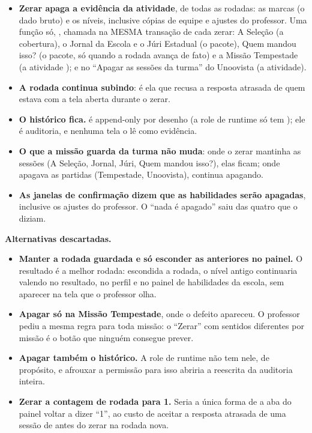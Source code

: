\begin{itemize}
  \item \textbf{Zerar apaga a evidência da atividade}, de todas as rodadas: as
    marcas (o dado bruto) e os níveis, inclusive cópias de equipe e ajustes do
    professor. Uma função só, , chamada
    na MESMA transação de cada zerar: A Seleção (a cobertura), o Jornal da
    Escola e o Júri Estadual (o pacote), Quem mandou isso? (o pacote, só
    quando a rodada avança de fato) e a Missão Tempestade (a atividade
    ); e no \enquote{Apagar as sessões da turma} do Unoovista (a
    atividade).
  \item \textbf{A rodada continua subindo}: é ela que recusa a resposta
    atrasada de quem estava com a tela aberta durante o zerar.
  \item \textbf{O histórico fica.}  é append-only por
    desenho (a role de runtime só tem ); ele é auditoria, e
    nenhuma tela o lê como evidência.
  \item \textbf{O que a missão guarda da turma não muda}: onde o zerar mantinha
    as sessões (A Seleção, Jornal, Júri, Quem mandou isso?), elas ficam; onde
    apagava as partidas (Tempestade, Unoovista), continua apagando.
  \item \textbf{As janelas de confirmação dizem que as habilidades serão
    apagadas}, inclusive os ajustes do professor. O \enquote{nada é apagado}
    saiu das quatro que o diziam.
\end{itemize}

\textbf{Alternativas descartadas.}

\begin{itemize}
  \item \textbf{Manter a rodada guardada e só esconder as anteriores no
    painel.} O resultado é a melhor rodada: escondida a rodada, o nível antigo
    continuaria valendo no resultado, no perfil e no painel de habilidades da
    escola, sem aparecer na tela que o professor olha.
  \item \textbf{Apagar só na Missão Tempestade}, onde o defeito apareceu. O
    professor pediu a mesma regra para toda missão: o \enquote{Zerar} com
    sentidos diferentes por missão é o botão que ninguém consegue prever.
  \item \textbf{Apagar também o histórico.} A role de runtime não tem
     nele, de propósito, e afrouxar a permissão para isso abriria a
    reescrita da auditoria inteira.
  \item \textbf{Zerar a contagem de rodada para 1.} Seria a única forma de a
    aba do painel voltar a dizer \enquote{1}, ao custo de aceitar a resposta
    atrasada de uma sessão de antes do zerar na rodada nova.
\end{itemize}


